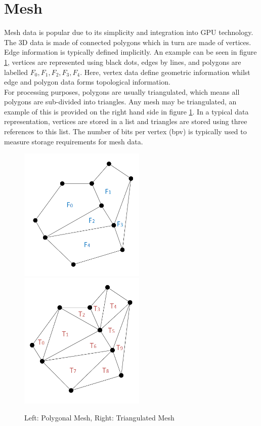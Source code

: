 
\section{Mesh}

Mesh data is popular due to its simplicity and integration into GPU technology. The 3D data is made of connected polygons which in turn are made of vertices. Edge information is typically defined implicitly. An example can be seen in figure \ref{MeshExamples}, vertices are represented using black dots, edges by lines, and polygons are labelled $F_0, F_1, F_2, F_3, F_4$. Here, vertex data define geometric information whilst edge and polygon data forms topological information. \\

For processing purposes, polygons are usually triangulated, which means all polygons are sub-divided into triangles. Any mesh may be triangulated, an example of this is provided on the right hand side in figure \ref{MeshExamples}. In a typical data representation, vertices are stored in a list and triangles are stored using three references to this list. The number of bits per vertex (bpv) is typically used to measure storage requirements for mesh data. \\

\begin{figure}[!h]
\centering
\includegraphics[width=6cm]{images/ch2/PolygonMeshExample}
\includegraphics[width=6cm]{images/ch2/TriangleMeshExample}
\caption{Left: Polygonal Mesh, Right: Triangulated Mesh}
\label{MeshExamples}
\end{figure}

